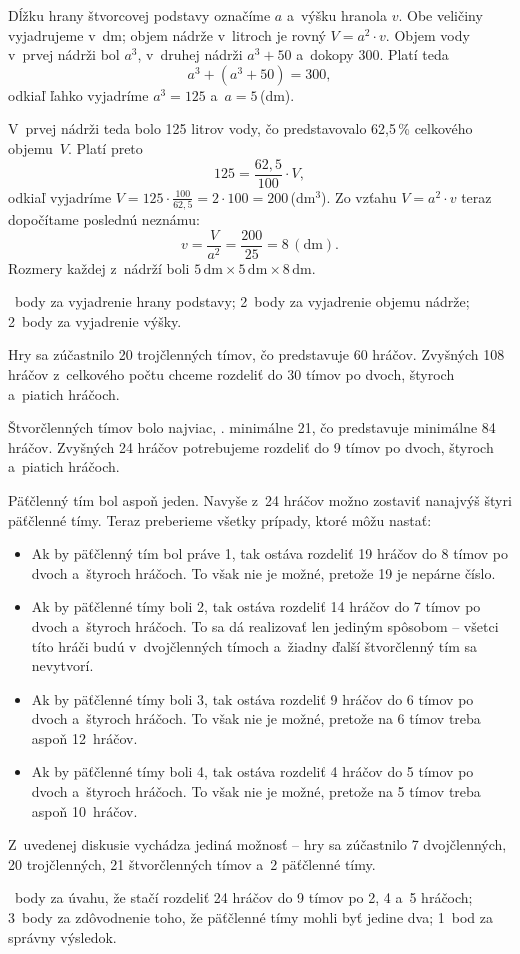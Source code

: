 {%
Dĺžku hrany štvorcovej podstavy označíme $a$ a~výšku hranola $v$.
Obe veličiny vyjadrujeme v~dm;
objem nádrže v~litroch je rovný $V=a^2\cdot v$.
Objem vody v~prvej nádrži bol $a^3$, v~druhej nádrži $a^3+50$
a~dokopy $300$.
Platí teda
$$
a^3+(a^3+50)=300,
$$
odkiaľ ľahko vyjadríme $a^3=125$ a~$a=5$\,(dm).

V~prvej nádrži teda bolo 125 litrov vody, čo predstavovalo 62{,}5\,\% celkového
objemu~$V$. Platí preto
$$
125=\frac{62{,}5}{100}\cdot V,
$$
odkiaľ vyjadríme $V=125\cdot\frac{100}{62{,}5}=2\cdot 100=200$\,(dm$^3$).
Zo vzťahu $V=a^2\cdot v$ teraz dopočítame poslednú neznámu:
$$
v=\frac{V}{a^2}=\frac{200}{25}=8\,(\text{dm}).
$$
Rozmery každej z~nádrží boli $5\,\text{dm}\times5\,\text{dm}\times8\,\text{dm}$.

~body za vyjadrenie hrany podstavy;
2~body za vyjadrenie objemu nádrže;
2~body za vyjadrenie výšky.
\endhodnotenie
}

{%
Hry sa zúčastnilo 20 trojčlenných tímov, čo predstavuje 60 hráčov.
Zvyšných 108 hráčov z~celkového počtu chceme rozdeliť do 30 tímov po dvoch,
štyroch a~piatich hráčoch.

Štvorčlenných tímov bolo najviac, \tj. minimálne 21, čo predstavuje minimálne
84 hráčov.
Zvyšných 24 hráčov potrebujeme rozdeliť do 9 tímov po dvoch, štyroch a~piatich hráčoch.

Päťčlenný tím bol aspoň jeden.
Navyše z~24 hráčov možno zostaviť nanajvýš štyri päťčlenné tímy.
Teraz preberieme všetky prípady, ktoré môžu nastať:
\begin{itemize}
  \item Ak by päťčlenný tím bol práve 1, tak ostáva rozdeliť 19 hráčov
    do 8 tímov po dvoch a~štyroch hráčoch.
    To však nie je možné, pretože 19 je nepárne číslo.
  \item Ak by päťčlenné tímy boli 2, tak ostáva rozdeliť 14 hráčov
    do 7 tímov po dvoch a~štyroch hráčoch.
    To sa dá realizovať len jediným spôsobom -- všetci títo hráči budú
    v~dvojčlenných tímoch a~žiadny ďalší štvorčlenný tím sa nevytvorí.
  \item Ak by päťčlenné tímy boli 3, tak ostáva rozdeliť 9 hráčov
    do 6 tímov po dvoch a~štyroch hráčoch.
    To však nie je možné, pretože na 6 tímov treba aspoň 12~hráčov.
  \item Ak by päťčlenné tímy boli 4, tak ostáva rozdeliť 4 hráčov
    do 5 tímov po dvoch a~štyroch hráčoch.
    To však nie je možné, pretože na 5 tímov treba aspoň 10~hráčov.
\end{itemize}

Z~uvedenej diskusie vychádza jediná možnosť --
hry sa zúčastnilo 7 dvojčlenných, 20 trojčlenných, 21 štvorčlenných tímov
a~2 päťčlenné tímy.

~body za úvahu, že stačí rozdeliť 24 hráčov do 9 tímov po 2, 4 a~5 hráčoch;
3~body za zdôvodnenie toho, že päťčlenné tímy mohli byť jedine dva;
1~bod za správny výsledok.
\endhodnotenie
}

